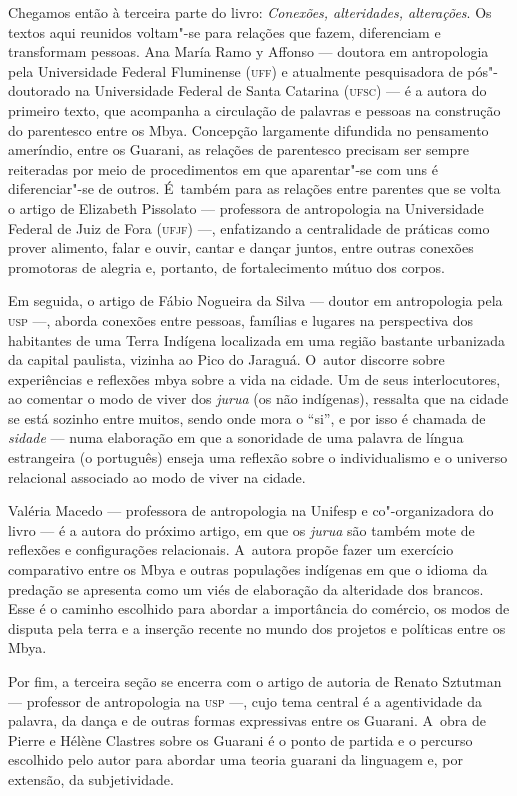 Chegamos então à terceira parte do livro: \emph{Conexões, alteridades,
alterações}. Os textos aqui reunidos voltam"-se para relações que fazem,
diferenciam e transformam pessoas. Ana María Ramo y Affonso --- doutora
em antropologia pela Universidade Federal Fluminense (\textsc{uff}) e atualmente
pesquisadora de pós"-doutorado na Universidade Federal de Santa Catarina
(\textsc{ufsc}) --- é a autora do primeiro texto, que acompanha a circulação de
palavras e pessoas na construção do parentesco entre os Mbya. Concepção
largamente difundida no pensamento ameríndio, entre os Guarani, as relações
de parentesco precisam ser sempre reiteradas por meio de procedimentos em
que aparentar"-se com uns é diferenciar"-se de outros. É~também para as
relações entre parentes que se volta o artigo de Elizabeth Pissolato ---
professora de antropologia na Universidade Federal de Juiz de Fora
(\textsc{ufjf}) ---, enfatizando a centralidade de práticas como prover alimento,
falar e ouvir, cantar e dançar juntos, entre outras conexões promotoras
de alegria e, portanto, de fortalecimento mútuo dos corpos.

Em seguida, o artigo de Fábio Nogueira da Silva --- doutor em antropologia
pela \textsc{usp} ---, aborda conexões entre pessoas, famílias e lugares na
perspectiva dos habitantes de uma Terra Indígena localizada em uma
região bastante urbanizada da capital paulista, vizinha ao Pico do
Jaraguá. O~autor discorre sobre experiências e reflexões mbya sobre a
vida na cidade. Um de seus interlocutores, ao comentar o modo de viver
dos \emph{jurua} (os não indígenas), ressalta que na cidade se está sozinho
entre muitos, sendo onde mora o ``si'', e por isso é chamada de \emph{sidade} ---
numa elaboração em que a sonoridade de uma palavra de língua
estrangeira (o português) enseja uma reflexão sobre o individualismo e
o universo relacional associado ao modo de viver na cidade.

Valéria Macedo --- professora de antropologia na Unifesp e co"-organizadora
do livro --- é a autora do próximo artigo, em que os \emph{jurua} são também
mote de reflexões e configurações relacionais. A~autora propõe fazer um
exercício comparativo entre os Mbya e outras populações indígenas em
que o idioma da predação se apresenta como um viés de elaboração da
alteridade dos brancos. Esse é o caminho escolhido para abordar a
importância do comércio, os modos de disputa pela terra e a inserção
recente no mundo dos projetos e políticas entre os Mbya. 

Por fim, a terceira seção se encerra com o artigo de autoria de Renato
Sztutman --- professor de antropologia na \textsc{usp} ---, cujo tema central é a
agentividade da palavra, da dança e de outras formas expressivas entre
os Guarani. A~obra de Pierre e Hélène Clastres sobre os Guarani é o
ponto de partida e o percurso escolhido pelo autor para abordar uma
teoria guarani da linguagem e, por extensão, da subjetividade. 

